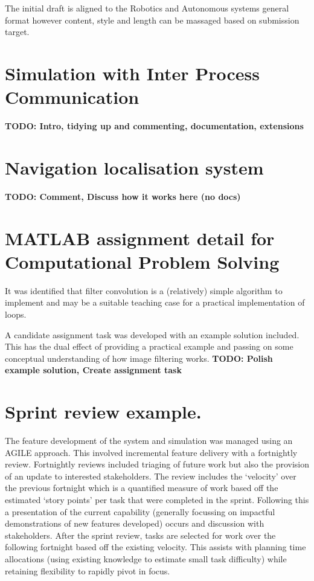 \documentclass{article}
\begin{document}
The initial draft is aligned to the Robotics and Autonomous systems general format however content, style and length can be massaged based on submission target.

\section{Simulation with Inter Process Communication}

\textbf{TODO: Intro, tidying up and commenting, documentation, extensions}

\section{Navigation localisation system}

\textbf{TODO: Comment, Discuss how it works here (no docs)}

\section{MATLAB assignment detail for Computational Problem Solving}

It was identified that filter convolution is a (relatively) simple algorithm to implement and may be a suitable teaching case for a practical implementation of loops.

A candidate assignment task was developed with an example solution included. This has the dual effect of providing a practical example and passing on some conceptual understanding of how image filtering works.
\textbf{TODO: Polish example solution, Create assignment task}

\section{Sprint review example.}

The feature development of the system and simulation was managed using an AGILE approach. This involved incremental feature delivery with a fortnightly review. Fortnightly reviews included triaging of future work but also the provision of an update to interested stakeholders. The review includes the `velocity' over the previous fortnight which is a quantified measure of work based off the estimated `story points' per task that were completed in the sprint. Following this a presentation of the current capability (generally focussing on impactful demonstrations of new features developed) occurs and discussion with stakeholders. After the sprint review, tasks are selected for work over the following fortnight based off the existing velocity. This assists with planning time allocations (using existing knowledge to estimate small task difficulty) while retaining flexibility to rapidly pivot in focus.
\end{document}
